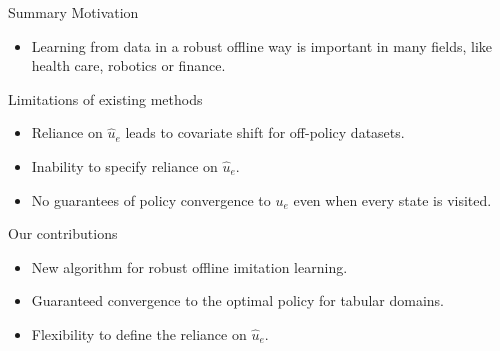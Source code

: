 \begin{block}{Summary}
\alert{Motivation}
\begin{itemize}
     \item Learning from data in a robust offline way is important in many fields, like health care, robotics or finance.
\end{itemize}
\alert{Limitations of existing  methods}
\begin{itemize}
    \item Reliance on $\hat{u}_e$ leads to covariate shift for off-policy datasets.
    \item Inability to specify reliance on $\hat{u}_e$.
    \item No guarantees of policy convergence to $u_e$ even when every state is visited.
\end{itemize}
\alert{Our contributions}
\begin{itemize}
     \item New algorithm for robust offline imitation learning.
     \item Guaranteed convergence to the optimal policy for tabular domains.
     \item Flexibility to define the reliance on $\hat{u}_e$.
\end{itemize}
\end{block}
